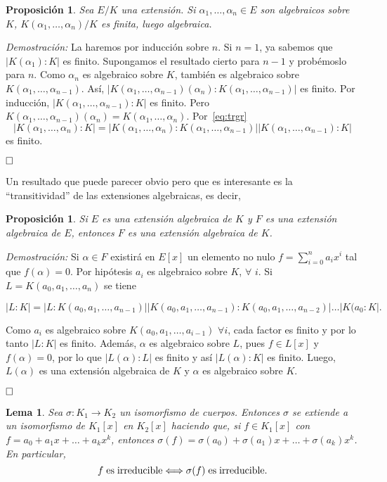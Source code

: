 \documentclass[12pt]{article}
\newtheorem{proposition}[theorem]{Proposición}
\newtheorem{lemma}{Lema}[theorem]
\begin{document}
\begin{proposition}\label{eq:finalg} Sea $E/K$ una extensión. Si $\alpha_{1}, \ldots, \alpha_{n} \in E$ son algebraicos sobre $K$, $K(\alpha_{1}, \ldots, \alpha_{n})/K$ es finita, luego algebraica.
\end{proposition}
\emph{Demostración: } La haremos por inducción sobre $n$. Si $n = 1$, ya sabemos que $|K(\alpha_{1}):K|$ es finito. Supongamos el resultado cierto para $n-1$ y probémoslo para $n$. Como $\alpha_{n}$ es algebraico sobre $K$, también es algebraico sobre $K(\alpha_{1}, \ldots, \alpha_{n-1})$. Así, $|K(\alpha_{1}, \ldots, \alpha_{n-1}) (\alpha_{n}) : K(\alpha_{1}, \ldots, \alpha_{n-1})|$ es finito. Por inducción, $|K(\alpha_{1}, \ldots, \alpha_{n-1}) : K|$ es finito. Pero $K(\alpha_{1}, \ldots, \alpha_{n-1}) (\alpha_{n}) = K(\alpha_{1}, \ldots, \alpha_{n})$. Por~\ref{eq:trgr} $$|K(\alpha_{1}, \ldots, \alpha_{n}) : K| = |K(\alpha_{1}, \ldots, \alpha_{n}) : K(\alpha_{1}, \ldots, \alpha_{n-1})| |K(\alpha_{1}, \ldots, \alpha_{n-1}) : K|$$ es finito.

$\hfill \square$

Un resultado que puede parecer obvio pero que es interesante es la “transitividad” de las extensiones algebraicas, es decir, 

\begin{proposition}Si $E$ es una extensión algebraica de $K$ y $F$ es una extensión algebraica de $E$, entonces $F$ es una extensión algebraica de $K$.
\end{proposition}
\emph{Demostración: } Si $\alpha \in F$ existirá en $E[x]$ un elemento no nulo $f = \sum _{i=0}^{n} a_{i}x^{i}$ tal que $f(\alpha)= 0$. Por hipótesis $a_{i}$ es algebraico sobre $K$, $\forall$ $i$. Si $L = K(a_{0}, a_{1}, \ldots, a_{n})$ se tiene \begin{center}$|L : K| = |L:K(a_{0}, a_{1}, \ldots, a_{n-1})| |K(a_{0}, a_{1}, \ldots, a_{n-1}):K(a_{0}, a_{1}, \ldots, a_{n-2})| \ldots |K(a_{0}:K|.$\end{center} Como $a_{i}$ es algebraico sobre $K(a_{0}, a_{1}, \ldots, a_{i-1})$ $\forall i$, cada factor es finito y por lo tanto $|L:K|$ es finito. Además, $\alpha$ es algebraico sobre $L$, pues $f \in L[x]$ y $f(\alpha) = 0$, por lo que $|L(\alpha):L|$ es finito y así $|L(\alpha) : K|$ es finito. Luego, $L(\alpha)$ es una extensión algebraica de $K$ y $\alpha$ es algebraico sobre $K$.

$\hfill \square$


\begin{lemma}Sea $\sigma \colon K_{1} \longrightarrow K_{2}$ un isomorfismo de cuerpos. Entonces $\sigma$ se extiende a un isomorfismo de $K_{1}[x]$ en $K_{2}[x]$ haciendo que, si $f \in K_{1}[x]$ con $f = a_{0} + a_{1}x + \ldots + a_{k}x^{k}$, entonces  $\sigma (f) =  \sigma(a_{0}) + \sigma( a_{1})x + \ldots + \sigma(a_{k})x^{k}$. En particular, $$f \hspace{0.1cm} \text{es} \hspace{0.1cm} \text{irreducible} \Longleftrightarrow \sigma (f) \hspace{0.1cm} \text{es} \hspace{0.1cm} \text{irreducible}.$$
\end{lemma}
\end{document}
